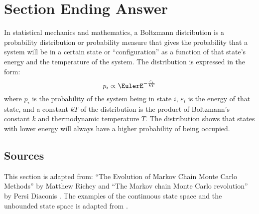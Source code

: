 \documentclass[12pt]{article}
\begin{document}


\section*{Section Ending Answer}

In statistical mechanics and mathematics, a Boltzmann distribution is a
probability distribution or probability measure that gives the
probability that a system will be in a certain state or
``configuration'' as a function of that state's energy and the
temperature of the system.  The distribution is expressed in the form:
\[
    p_{i}\propto \EulerE^{-{\frac {\varepsilon _{i}}{kT}}}
\] where \( p_i \) is the probability of the system being in state \( i \),
\( \varepsilon_i \) is the energy of that state, and a constant \( kT \)
of the distribution is the product of Boltzmann's constant \( k \) and
thermodynamic temperature \( T \).  The distribution shows that states
with lower energy will always have a higher probability of being
occupied.

\subsection*{Sources} This section is adapted from:  ``The Evolution of
Markov Chain Monte Carlo Methods'' by Matthew Richey
\cite{richey10} and ``The Markov chain Monte Carlo revolution'' by Persi
Diaconis
\cite{diaconis09}.  The examples of the continuous state space and the
unbounded state space is adapted from
\cite{jiang21}.

\hr

\end{document}

